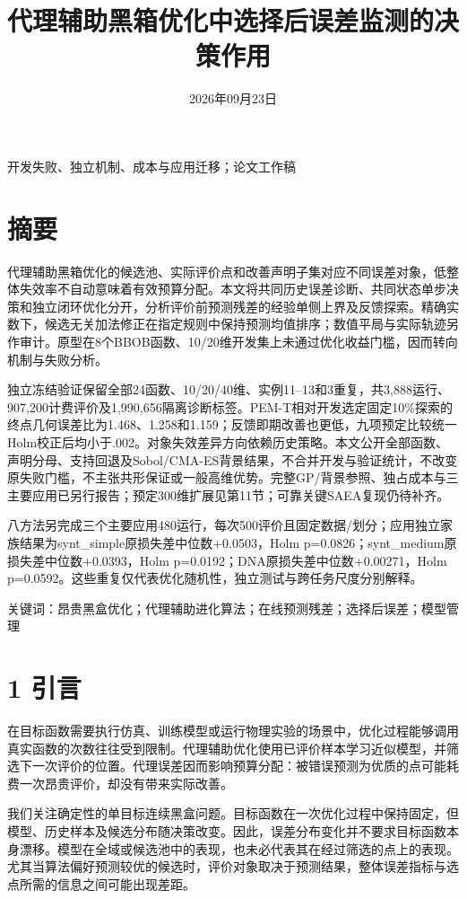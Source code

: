 \documentclass[11pt,a4paper]{article}
\title{代理辅助黑箱优化中选择后误差监测的决策作用}
\author{}
\date{2026年09月23日}
\begin{document}
\maketitle
\begin{center}开发失败、独立机制、成本与应用迁移；论文工作稿\end{center}
\hypertarget{ux6458ux8981}{%
\section{摘要}\label{ux6458ux8981}}

代理辅助黑箱优化的候选池、实际评价点和改善声明子集对应不同误差对象，低整体失效率不自动意味着有效预算分配。本文将共同历史误差诊断、共同状态单步决策和独立闭环优化分开，分析评价前预测残差的经验单侧上界及反馈探索。精确实数下，候选无关加法修正在指定规则中保持预测均值排序；数值平局与实际轨迹另作审计。原型在8个BBOB函数、10/20维开发集上未通过优化收益门槛，因而转向机制与失败分析。

独立冻结验证保留全部24函数、10/20/40维、实例11--13和3重复，共3,888运行、907,200计费评价及1,990,656隔离诊断标签。PEM-T相对开发选定固定10\%探索的终点几何误差比为1.468、1.258和1.159；反馈即期改善也更低，九项预定比较统一Holm校正后均小于.002。对象失效差异方向依赖历史策略。本文公开全部函数、声明分母、支持回退及Sobol/CMA-ES背景结果，不合并开发与验证统计，不改变原失败门槛，不主张共形保证或一般高维优势。完整GP/背景参照、独占成本与三主要应用已另行报告；预定300维扩展见第11节；可靠关键SAEA复现仍待补齐。

八方法另完成三个主要应用480运行，每次500评价且固定数据/划分；应用独立家族结果为synt\_simple原损失差中位数+0.0503，Holm
p=0.0826；synt\_medium原损失差中位数+0.0393，Holm
p=0.0192；DNA原损失差中位数+0.00271，Holm
p=0.0592。这些重复仅代表优化随机性，独立测试与跨任务尺度分别解释。

关键词：昂贵黑盒优化；代理辅助进化算法；在线预测残差；选择后误差；模型管理

\hypertarget{ux5f15ux8a00}{%
\section{1 引言}\label{ux5f15ux8a00}}

在目标函数需要执行仿真、训练模型或运行物理实验的场景中，优化过程能够调用真实函数的次数往往受到限制。代理辅助优化使用已评价样本学习近似模型，并筛选下一次评价的位置。代理误差因而影响预算分配：被错误预测为优质的点可能耗费一次昂贵评价，却没有带来实际改善。

我们关注确定性的单目标连续黑盒问题。目标函数在一次优化过程中保持固定，但模型、历史样本及候选分布随决策改变。因此，误差分布变化并不要求目标函数本身漂移。模型在全域或候选池中的表现，也未必代表其在经过筛选的点上的表现。尤其当算法偏好预测较优的候选时，评价对象取决于预测结果，整体误差指标与选点所需的信息之间可能出现差距。
\end{document}

